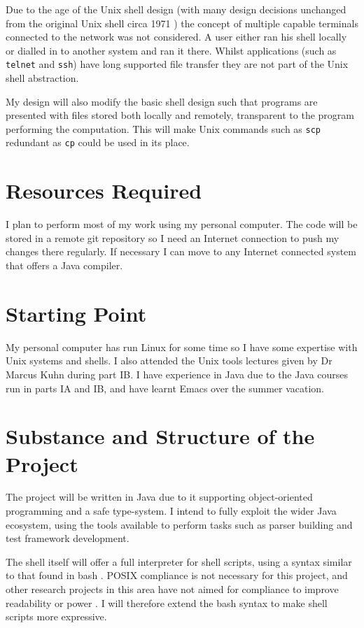 \documentclass[12pt]{article}
\begin{document}
Due to the age of the Unix shell design (with many design decisions
unchanged from the original Unix shell circa 1971 \cite{firstshell})
the concept of multiple capable terminals connected to the network was
not considered. A user either ran his shell locally or dialled in to
another system and ran it there. Whilst applications (such as
\texttt{telnet} and \texttt{ssh}) have long supported file transfer
they are not part of the Unix shell abstraction.

My design will also modify the basic shell design such that programs are
presented with files stored both locally and remotely, transparent to
the program performing the computation. This will make Unix commands
such as \texttt{scp} redundant as \texttt{cp} could be used in its
place.

\section*{Resources Required}
I plan to perform most of my work using my personal computer. The code
will be stored in a remote git repository so I need an Internet
connection to push my changes there regularly. If necessary I can move
to any Internet connected system that offers a Java compiler.

\section*{Starting Point}
My personal computer has run Linux for some time so I have some
expertise with Unix systems and shells. I also attended the Unix tools
lectures given by Dr Marcus Kuhn during part IB. I have experience in
Java due to the Java courses run in parts IA and IB, and have learnt
Emacs over the summer vacation.

\section*{Substance and Structure of the Project}
The project will be written in Java due to it supporting
object-oriented programming and a safe type-system. I intend to fully
exploit the wider Java ecosystem, using the tools available to perform
tasks such as parser building and test framework development.

The shell itself will offer a full interpreter for shell scripts,
using a syntax similar to that found in bash \cite{bash}. POSIX
compliance \cite{posix} is not necessary for this project, and other
research projects in this area have not aimed for compliance to improve
readability \cite{fish} or power \cite{powershell}. I will therefore
extend the bash syntax to make shell scripts more expressive. 
\end{document}
